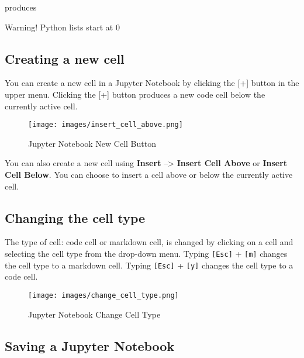 \documentclass{book}
\makeatletter
\def\maxwidth{\ifdim\Gin@nat@width>\linewidth\linewidth
\else\Gin@nat@width\fi}
\let\Oldincludegraphics\includegraphics
\renewcommand{\includegraphics}[1]{\Oldincludegraphics[width=.8\maxwidth]{#1}}
\newcommand{\passthrough}[1]{#1}
\makeatother
\begin{document}
produces

Warning! Python lists start at 0
    




    
        \hypertarget{creating-a-new-cell}{%
\subsection{Creating a new cell}\label{creating-a-new-cell}}

You can create a new cell in a Jupyter Notebook by clicking the {[}+{]}
button in the upper menu. Clicking the {[}+{]} button produces a new
code cell below the currently active cell.

\begin{figure}
\centering
\texttt{[image: images/insert\_cell\_above.png]}
\caption{Jupyter Notebook New Cell Button}
\end{figure}

You can also create a new cell using \textbf{Insert} --\textgreater{}
\textbf{Insert Cell Above} or \textbf{Insert Cell Below}. You can choose
to insert a cell above or below the currently active cell.
    




    
        \hypertarget{changing-the-cell-type}{%
\subsection{Changing the cell type}\label{changing-the-cell-type}}

The type of cell: code cell or markdown cell, is changed by clicking on
a cell and selecting the cell type from the drop-down menu. Typing
\passthrough{\lstinline![Esc]!} + \passthrough{\lstinline![m]!} changes
the cell type to a markdown cell. Typing \passthrough{\lstinline![Esc]!}
+ \passthrough{\lstinline![y]!} changes the cell type to a code cell.

\begin{figure}
\centering
\texttt{[image: images/change\_cell\_type.png]}
\caption{Jupyter Notebook Change Cell Type}
\end{figure}
    




    
        \hypertarget{saving-a-jupyter-notebook}{%
\subsection{Saving a Jupyter Notebook}\label{saving-a-jupyter-notebook}}
\end{document}
